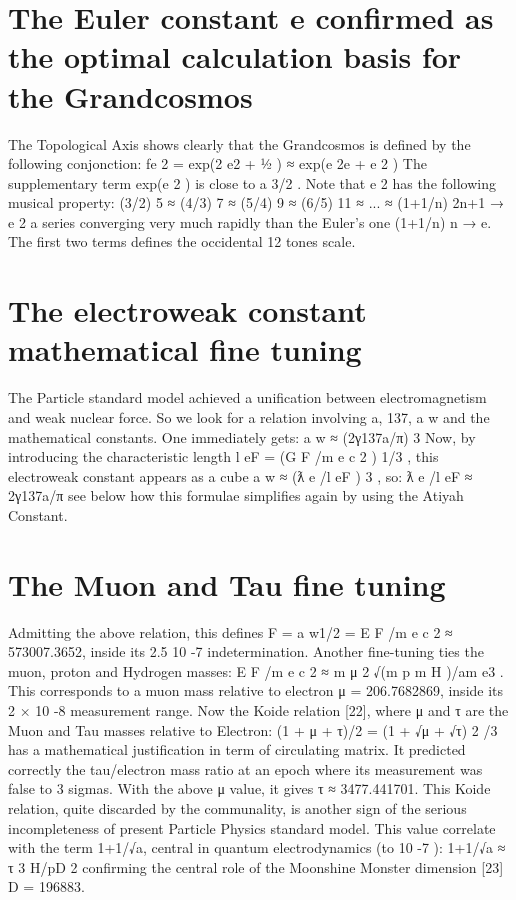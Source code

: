 \section {The Euler constant e confirmed as the optimal calculation basis for the Grandcosmos}

The Topological Axis shows clearly that the Grandcosmos is defined by the following
conjonction:
f{e 2 } = exp(2 e2 + 1⁄2 ) ≈ exp(e 2e + e 2 )
The supplementary term exp(e 2 ) is close to a 3/2 . Note that e 2 has the following musical property:
(3/2) 5 ≈ (4/3) 7 ≈ (5/4) 9 ≈ (6/5) 11 ≈ ... ≈ (1+1/n) 2n+1
→
e 2
a series converging very much rapidly than the Euler's one (1+1/n) n → e. The first two terms defines
the occidental 12 tones scale.

\section {The electroweak constant mathematical fine tuning}

The Particle standard model achieved a unification between electromagnetism and weak
nuclear force. So we look for a relation involving a, 137, a w and the mathematical constants. One
immediately gets:
a w ≈ (2γ137a/π) 3
Now, by introducing the characteristic length l eF = (G F /m e c 2 ) 1/3 , this electroweak constant appears as
a cube a w ≈ (ƛ e /l eF ) 3 , so:
ƛ e /l eF ≈ 2γ137a/π
see below how this formulae simplifies again by using the Atiyah Constant.

\section {The Muon and Tau fine tuning}

Admitting the above relation, this defines F = a w1/2 = E F /m e c 2 ≈ 573007.3652, inside its 2.5 10 -7
indetermination. Another fine-tuning ties the muon, proton and Hydrogen masses: E F /m e c 2 ≈
m μ 2 √(m p m H )/am e3 . This corresponds to a muon mass relative to electron μ = 206.7682869, inside its
2 × 10 -8 measurement range.
Now the Koide relation [22], where μ and τ are the Muon and Tau masses relative to Electron:
(1 + μ + τ)/2 = (1 + √μ + √τ) 2 /3
has a mathematical justification in term of circulating matrix. It predicted correctly the tau/electron
mass ratio at an epoch where its measurement was false to 3 sigmas. With the above μ value, it
gives τ ≈ 3477.441701. This Koide relation, quite discarded by the communality, is another sign of
the serious incompleteness of present Particle Physics standard model. This value correlate with the
term 1+1/√a, central in quantum electrodynamics (to 10 -7 ):
1+1/√a ≈ τ 3 H/pD 2
confirming the central role of the Moonshine Monster dimension [23] D = 196883.

